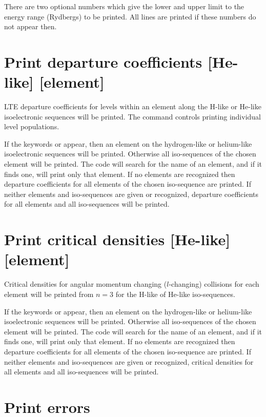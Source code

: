 There are two optional numbers which give the lower and upper limit to
the energy range (Rydbergs) to be printed.
All lines are printed if these
numbers do not appear then.

\section{Print departure coefficients [He-like] [element]}

LTE departure coefficients for levels within an element along the H-like
or He-like isoelectronic sequences will be printed.
The 
command controls printing individual level populations.

If the keywords  or  appear,
then an element on the hydrogen-like or helium-like
isoelectronic sequences will be printed.
Otherwise all iso-sequences of the chosen element will be printed.
The code will search for the name of
an element, and if it finds one, will print only that element.
If no
elements are recognized then departure coefficients for all elements of the chosen
iso-sequence are printed.
If neither elements and iso-sequences are given or recognized, departure coefficients for
all elements and all iso-sequences will be printed.

\section{Print critical densities [He-like] [element]}

Critical densities for angular momentum changing ($l$-changing) collisions for
each element will be printed from $n=3$ for the H-like of He-like iso-sequences. 

If the keywords  or  appear,
then an element on the hydrogen-like or helium-like
isoelectronic sequences will be printed.
Otherwise all iso-sequences of the chosen element will be printed.
The code will search for the name of
an element, and if it finds one, will print only that element.
If no
elements are recognized then departure coefficients for all elements of the chosen
iso-sequence are printed.
If neither elements and iso-sequences are given or recognized, critical
densities for all elements and all iso-sequences will be printed.

\section{Print errors}

